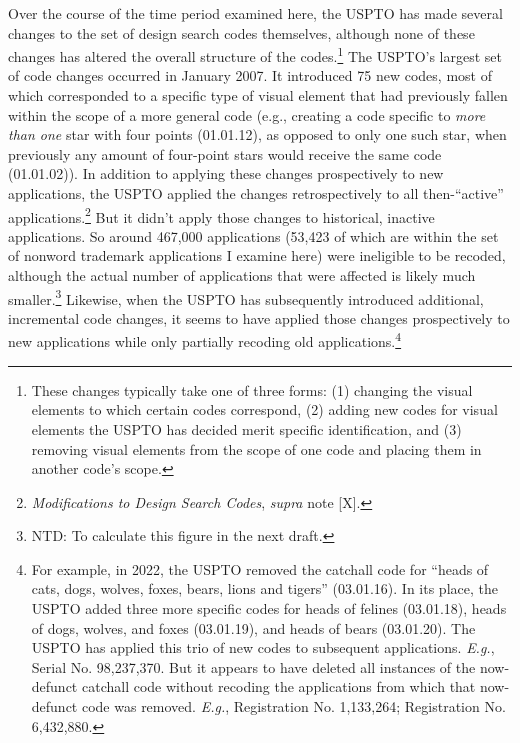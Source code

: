 \documentclass[letterpaper, 11pt, oneside]{article}
\begin{document}
\begin{enumerate}
Over the course of the time period examined here, the USPTO has made several changes to the set of design search codes themselves, although none of these changes has altered the overall structure of the codes.\footnote{These changes typically take one of three forms: (1) changing the visual elements to which certain codes correspond, (2) adding new codes for visual elements the USPTO has decided merit specific identification, and (3) removing visual elements from the scope of one code and placing them in another code's scope.} The USPTO's largest set of code changes occurred in January 2007. It introduced 75 new codes, most of which corresponded to a specific type of visual element that had previously fallen within the scope of a more general code (e.g., creating a code specific to \emph{more than one} star with four points (01.01.12), as opposed to only one such star, when previously any amount of four-point stars would receive the same code (01.01.02)). In addition to applying these changes prospectively to new applications, the USPTO applied the changes retrospectively to all then-``active'' applications.\footnote{\textit{Modifications to Design Search Codes}, \textit{supra} note [X].} But it didn't apply those changes to historical, inactive applications. So around 467,000 applications (53,423 of which are within the set of nonword trademark applications I examine here) were ineligible to be recoded, although the actual number of applications that were affected is likely much smaller.\footnote{NTD: To calculate this figure in the next draft.} Likewise, when the USPTO has subsequently introduced additional, incremental code changes, it seems to have applied those changes prospectively to new applications while only partially recoding old applications.\footnote{For example, in 2022, the USPTO removed the catchall code for ``heads of cats, dogs, wolves, foxes, bears, lions and tigers'' (03.01.16). In its place, the USPTO added three more specific codes for heads of felines (03.01.18), heads of dogs, wolves, and foxes (03.01.19), and heads of bears (03.01.20). The USPTO has applied this trio of new codes to subsequent applications. \textit{E.g.}, Serial No. 98,237,370. But it appears to have deleted all instances of the now-defunct catchall code without recoding the applications from which that now-defunct code was removed. \textit{E.g.}, Registration No. 1,133,264; Registration No. 6,432,880.}


\end{enumerate}
\end{document}
